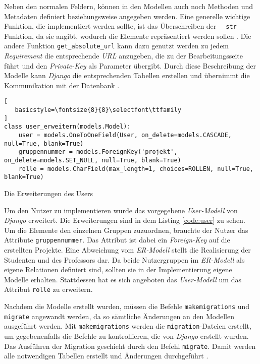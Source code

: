 \documentclass[11pt,a4paper]{report}
\begin{document}
Neben den normalen Feldern, können in den Modellen auch noch Methoden und Metadaten definiert beziehungsweise angegeben werden. Eine generelle wichtige Funktion, die implementiert werden sollte, ist das Überschreiben der \verb|__str__| Funktion, da sie angibt, wodurch die Elemente repräsentiert werden sollen \cite{mozillatuto5}. Die andere Funktion \verb|get_absolute_url| kann dazu genutzt werden zu jedem \textit{Requirement} die entsprechende \textit{URL} anzugeben, die zu der Bearbeitungsseite führt und den \textit{Private-Key} als Parameter übergibt. Durch diese Beschreibung der Modelle kann \textit{Django} die entsprechenden Tabellen erstellen und übernimmt die Kommunikation mit der Datenbank \cite{djangotuto4}.


\begin{listing}[htbp]
\begin{lstlisting}[
   basicstyle=\fontsize{8}{8}\selectfont\ttfamily
]
class user_erweitern(models.Model):
    user = models.OneToOneField(User, on_delete=models.CASCADE, null=True, blank=True)
    gruppennummer = models.ForeignKey('projekt', on_delete=models.SET_NULL, null=True, blank=True)
    rolle = models.CharField(max_length=1, choices=ROLLEN, null=True, blank=True)
\end{lstlisting}
\caption{Die Erweiterungen des Users}
\label{code:user}
\end{listing}


Um den Nutzer zu implementieren wurde das vorgegebene \textit{User-Modell} von \textit{Django} erweitert. Die Erweiterungen sind in dem Listing \ref{code:user} zu sehen. Um die Elemente den einzelnen Gruppen zuzuordnen, brauchte der Nutzer das Attribute \verb|gruppennummer|. Das Attribut ist dabei ein \textit{Foreign-Key} auf die erstellten Projekte. Eine Abweichung vom \textit{ER-Modell} stellt die Realisierung der Studenten und des Professors dar. Da beide Nutzergruppen im \textit{ER-Modell} als eigene Relationen definiert sind, sollten sie in der Implementierung eigene Modelle erhalten. Stattdessen hat es sich angeboten das \textit{User-Modell} um das Attribut \verb|rolle| zu erweitern.



Nachdem die Modelle erstellt wurden, müssen die Befehle \verb|makemigrations| und \verb|migrate| angewandt werden, da so sämtliche Änderungen an den Modellen ausgeführt werden. Mit \verb|makemigrations| werden die \verb|migration|-Dateien erstellt, um gegebenenfalls die Befehle zu kontrollieren, die von \textit{Django} erstellt wurden. Das Ausführen der Migration geschieht durch den Befehl \verb|migrate|. Damit werden alle notwendigen Tabellen erstellt und Änderungen durchgeführt \cite{djangotuto4}.
\end{document}
